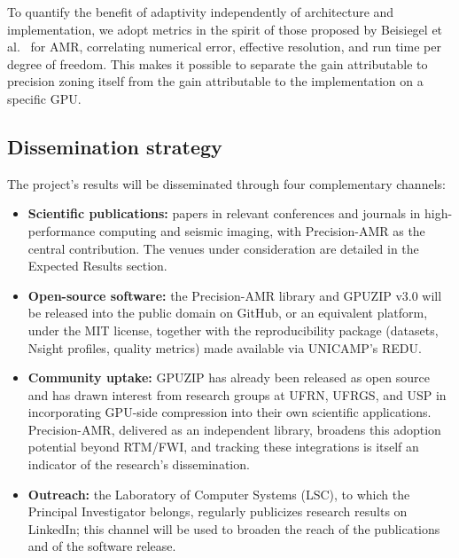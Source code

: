 \documentclass[12pt,a4paper]{article}
\begin{document}
To quantify the benefit of adaptivity independently of architecture and
implementation, we adopt metrics in the spirit of those proposed by
Beisiegel et al.~\cite{beisiegel2021metrics} for AMR, correlating numerical
error, effective resolution, and run time per degree of freedom. This makes
it possible to separate the gain attributable to precision zoning itself
from the gain attributable to the implementation on a specific GPU.

\subsection{Dissemination strategy}

The project's results will be disseminated through four complementary
channels:

\begin{itemize}
  \item \textbf{Scientific publications:} papers in relevant conferences
        and journals in high-performance computing and seismic imaging,
        with Precision-AMR as the central contribution. The venues under
        consideration are detailed in the Expected Results section.
  \item \textbf{Open-source software:} the Precision-AMR library and GPUZIP
        v3.0 will be released into the public domain on GitHub, or an
        equivalent platform, under the MIT license, together with the
        reproducibility package (datasets, Nsight profiles, quality
        metrics) made available via UNICAMP's REDU.
  \item \textbf{Community uptake:} GPUZIP has already been released as
        open source and has drawn interest from research groups at UFRN,
        UFRGS, and USP in incorporating GPU-side compression into their own
        scientific applications. Precision-AMR, delivered as an independent
        library, broadens this adoption potential beyond RTM/FWI, and
        tracking these integrations is itself an indicator of the
        research's dissemination.
  \item \textbf{Outreach:} the Laboratory of Computer Systems (LSC), to
        which the Principal Investigator belongs, regularly publicizes
        research results on LinkedIn; this channel will be used to broaden
        the reach of the publications and of the software release.
\end{itemize}

\iffalse
\end{document}
